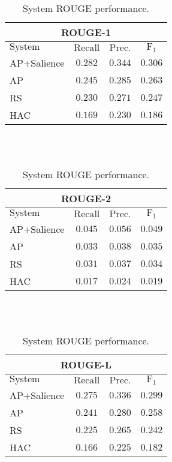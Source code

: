 \begin{table}[h]
\centering
\begin{tabular}{l c c c}
\multicolumn{4}{c}{ROUGE-1}\\
\hline
\hline
$\mathrm{System}$ & $\mathrm{Recall}$ & $\mathrm{Prec.}$ & $\mathrm{F}_1$\\
[0.5ex]
\hline
AP+Salience & $0.282$ & $0.344$ & $0.306$ \\
AP          & $0.245$ & $0.285$ & $0.263$ \\
RS          & $0.230$ & $0.271$ & $0.247$ \\
HAC         & $0.169$ & $0.230$ & $0.186$ \\
\hline %
\end{tabular}
~\\[1ex]
~\\
\begin{tabular}{l c c c}
\multicolumn{4}{c}{ROUGE-2}\\
\hline
\hline
$\mathrm{System}$ & $\mathrm{Recall}$ & $\mathrm{Prec.}$ & $\mathrm{F}_1$\\[0.5ex]
\hline
AP+Salience & $0.045$ & $0.056$ & $0.049$ \\
AP          & $0.033$ & $0.038$ & $0.035$ \\
RS          & $0.031$ & $0.037$ & $0.034$ \\
HAC         & $0.017$ & $0.024$ & $0.019$ \\
\hline %
\end{tabular}
~\\[1ex]
~\\
\begin{tabular}{l c c c}
\multicolumn{4}{c}{ROUGE-L}\\
\hline
\hline
$\mathrm{System}$ & $\mathrm{Recall}$ & $\mathrm{Prec.}$ & $\mathrm{F}_1$\\[0.5ex]
\hline
AP+Salience & $0.275$ & $0.336$ & $0.299$ \\
AP          & $0.241$ & $0.280$ & $0.258$ \\
RS          & $0.225$ & $0.265$ & $0.242$ \\
HAC         & $0.166$ & $0.225$ & $0.182$ \\
\hline %
\end{tabular}


\caption{System ROUGE performance.} %
\label{tab:rouge}
\end{table}





